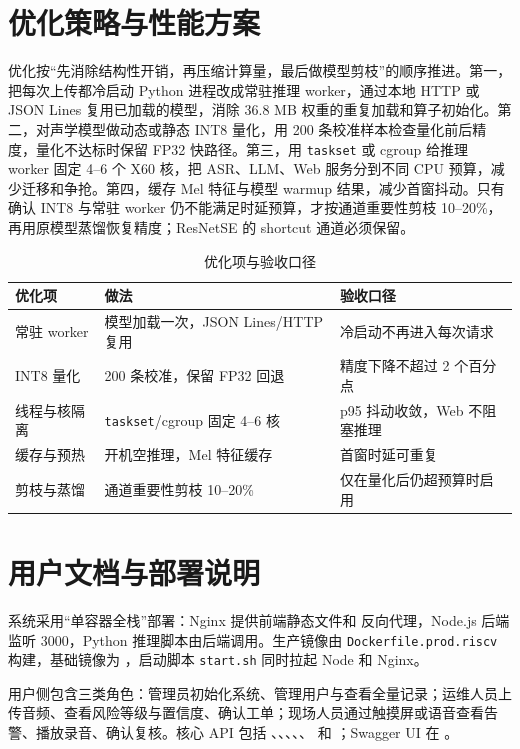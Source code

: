 \documentclass[lang=cn,11pt,scheme=chinese,chinesefont=nofont,color=green]{elegantbook}
\begin{document}
\section{优化策略与性能方案}

优化按“先消除结构性开销，再压缩计算量，最后做模型剪枝”的顺序推进。第一，把每次上传都冷启动 Python 进程改成常驻推理 worker，通过本地 HTTP 或 JSON Lines 复用已加载的模型，消除 36.8 MB 权重的重复加载和算子初始化。第二，对声学模型做动态或静态 INT8 量化，用 200 条校准样本检查量化前后精度，量化不达标时保留 FP32 快路径。第三，用 \texttt{taskset} 或 cgroup 给推理 worker 固定 4--6 个 X60 核，把 ASR、LLM、Web 服务分到不同 CPU 预算，减少迁移和争抢。第四，缓存 Mel 特征与模型 warmup 结果，减少首窗抖动。只有确认 INT8 与常驻 worker 仍不能满足时延预算，才按通道重要性剪枝 10--20\%，再用原模型蒸馏恢复精度；ResNetSE 的 shortcut 通道必须保留。

\begin{table}[htbp]
\centering
\small
\caption{优化项与验收口径}
\label{tab:optimization}
\begin{tabular}{p{3.6cm}p{6.4cm}p{4.4cm}}
\toprule
优化项 & 做法 & 验收口径 \\
\midrule
常驻 worker & 模型加载一次，JSON Lines/HTTP 复用 & 冷启动不再进入每次请求 \\
INT8 量化 & 200 条校准，保留 FP32 回退 & 精度下降不超过 2 个百分点 \\
线程与核隔离 & \texttt{taskset}/cgroup 固定 4--6 核 & p95 抖动收敛，Web 不阻塞推理 \\
缓存与预热 & 开机空推理，Mel 特征缓存 & 首窗时延可重复 \\
剪枝与蒸馏 & 通道重要性剪枝 10--20\% & 仅在量化后仍超预算时启用 \\
\bottomrule
\end{tabular}
\end{table}

\section{用户文档与部署说明}

系统采用“单容器全栈”部署：Nginx 提供前端静态文件和  反向代理，Node.js 后端监听 3000，Python 推理脚本由后端调用。生产镜像由 \texttt{Dockerfile.prod.riscv} 构建，基础镜像为 ，启动脚本 \texttt{start.sh} 同时拉起 Node 和 Nginx。

用户侧包含三类角色：管理员初始化系统、管理用户与查看全量记录；运维人员上传音频、查看风险等级与置信度、确认工单；现场人员通过触摸屏或语音查看告警、播放录音、确认复核。核心 API 包括 、、、、、 和 ；Swagger UI 在 。
\end{document}
